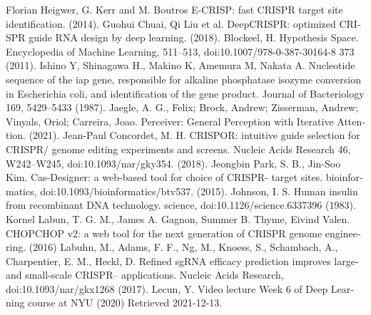 \documentclass[12pt,a4paper,BCOR=.7cm,headsepline,bibliography=totoc]{report}
\begin{document}
\begin{thebibliography}{1}
\begin{latin}
 {Florian Heigwer, G. Kerr and M. Boutros E-CRISP: fast CRISPR target site identification. (2014).}	
 {Guohui Chuai, Qi Liu et al. DeepCRISPR: optimized CRISPR guide RNA design by deep learning.  (2018).}
 {Blockeel, H. Hypothesis Space. Encyclopedia of Machine Learning, 511–513, doi:10.1007/978-0-387-30164-8 373 (2011).}
 {Ishino Y, Shinagawa H., Makino K, Amemura M, Nakata A. Nucleotide sequence of the iap gene, responsible for alkaline phosphatase isozyme conversion in Escherichia coli, and identification of the gene product. Journal of Bacteriology 169, 5429–5433 (1987).}
 {Jaegle, A. G., Felix; Brock, Andrew; Zisserman, Andrew; Vinyals, Oriol; Carreira, Joao. Perceiver: General Perception with Iterative Attention.  (2021).}
 {Jean-Paul Concordet, M. H. CRISPOR: intuitive guide selection for CRISPR/ genome editing experiments and screens. Nucleic Acids Research 46, W242–W245, doi:10.1093/nar/gky354.  (2018).}
 {Jeongbin Park, S. B., Jin-Soo Kim. Cas-Designer: a web-based tool for choice of CRISPR- target sites. bioinformatics, doi:10.1093/bioinformatics/btv537.  (2015).}
 {Johnson, I. S. Human insulin from recombinant DNA technology. science, doi:10.1126/science.6337396 (1983).}
 {Kornel Labun, T. G. M., James A. Gagnon, Summer B. Thyme, Eivind Valen. CHOPCHOP v2: a web tool for the next generation of CRISPR genome engineering. (2016)}
 {Labuhn, M., Adams, F. F., Ng, M., Knoess, S., Schambach, A., Charpentier, E. M., Heckl, D. Refined sgRNA efficacy prediction improves large- and small-scale CRISPR– applications. Nucleic Acids Research, doi:10.1093/nar/gkx1268 (2017).}
 {Lecun, Y. Video lecture Week 6 of Deep Learning course at NYU (2020) Retrieved 2021-12-13.}

\end{latin}
\end{thebibliography}
\end{document}
